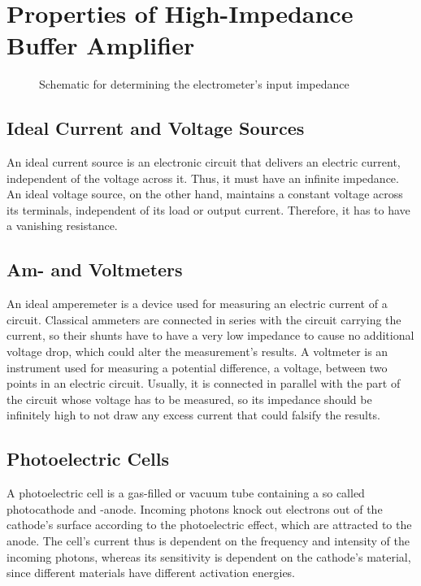 \chapter{Properties of High-Impedance Buffer Amplifier}
\begin{figure}
	\centering
	\caption{Schematic for determining the electrometer's input impedance}
	\label{fig:elec_in_im}
\end{figure}

\section{Ideal Current and Voltage Sources}
An ideal current source is an electronic circuit that delivers an electric current, independent of the voltage across it.
Thus, it must have an infinite impedance.
An ideal voltage source, on the other hand, maintains a constant voltage across its terminals, independent of its load or output current.
Therefore, it has to have a vanishing resistance.

\section{Am- and Voltmeters}
An ideal amperemeter is a device used for measuring an electric current of a circuit.
Classical ammeters are connected in series with the circuit carrying the current, so their shunts have to have a very low impedance to cause no additional voltage drop, which could alter the measurement's results.
A voltmeter is an instrument used for measuring a potential difference, a voltage, between two points in an electric circuit.
Usually, it is connected in parallel with the part of the circuit whose voltage has to be measured, so its impedance should be infinitely high to not draw any excess current that could falsify the results.

\section{Photoelectric Cells}
A photoelectric cell is a gas-filled or vacuum tube containing a so called photocathode and -anode.
Incoming photons knock out electrons out of the cathode's surface according to the photoelectric effect, which are attracted to the anode.
The cell's current thus is dependent on the frequency and intensity of the incoming photons, whereas its sensitivity is dependent on the cathode's material, since different materials have different activation energies.


